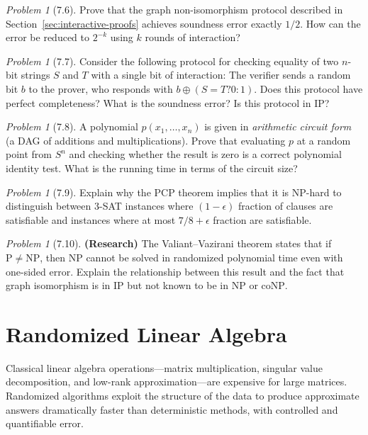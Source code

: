 \documentclass[twoside,12pt]{book}
\theoremstyle{plain}
\theoremstyle{definition}
\theoremstyle{remark}
\newtheorem{problem}[theorem]{Problem}
\begin{document}
\begin{problem}[7.6]
Prove that the graph non-isomorphism protocol described in Section~\ref{sec:interactive-proofs} achieves soundness error exactly $1/2$. How can the error be reduced to $2^{-k}$ using $k$ rounds of interaction?
\end{problem}

\begin{problem}[7.7]
Consider the following protocol for checking equality of two $n$-bit strings $S$ and $T$ with a single bit of interaction: The verifier sends a random bit $b$ to the prover, who responds with $b \oplus (S = T ? 0 : 1)$. Does this protocol have perfect completeness? What is the soundness error? Is this protocol in $\mathrm{IP}$?
\end{problem}

\begin{problem}[7.8]
A polynomial $p(x_1, \ldots, x_n)$ is given in \emph{arithmetic circuit form} (a DAG of additions and multiplications). Prove that evaluating $p$ at a random point from $S^n$ and checking whether the result is zero is a correct polynomial identity test. What is the running time in terms of the circuit size?
\end{problem}

\begin{problem}[7.9]
Explain why the PCP theorem implies that it is NP-hard to distinguish between 3-SAT instances where $(1-\epsilon)$ fraction of clauses are satisfiable and instances where at most $7/8 + \epsilon$ fraction are satisfiable.
\end{problem}

\begin{problem}[7.10]
\textbf{(Research)} The Valiant--Vazirani theorem states that if $\mathrm{P} \neq \mathrm{NP}$, then NP cannot be solved in randomized polynomial time even with one-sided error. Explain the relationship between this result and the fact that graph isomorphism is in $\mathrm{IP}$ but not known to be in $\mathrm{NP}$ or $\mathrm{coNP}$.
\end{problem}

\section{Randomized Linear Algebra}
\label{sec:randomized-la}

Classical linear algebra operations---matrix multiplication, singular value decomposition, and low-rank approximation---are expensive for large matrices. Randomized algorithms exploit the structure of the data to produce approximate answers dramatically faster than deterministic methods, with controlled and quantifiable error.
\end{document}
